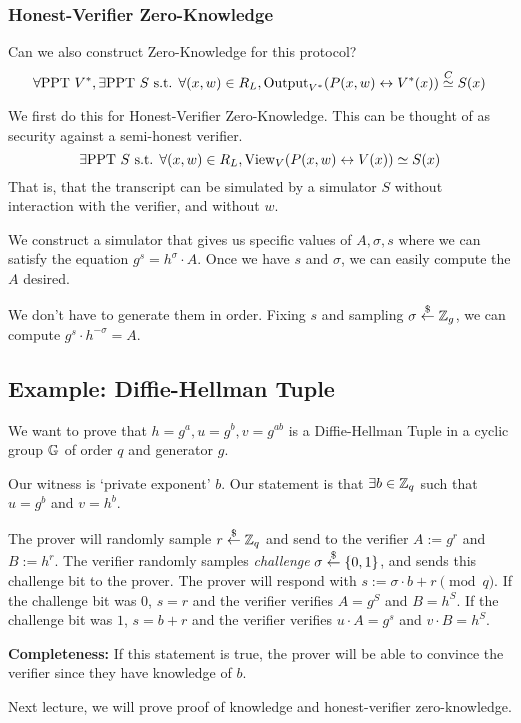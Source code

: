 \subsubsection{Honest-Verifier Zero-Knowledge}
Can we also construct Zero-Knowledge for this protocol?
\[\forall\mathrm{PPT}\ V^*, \exists\mathrm{PPT}\ S \text{ s.t. }\forall (x, w)\in R_L, \mathrm{Output}_{V^*}(P(x, w)\leftrightarrow V^*(x))\overset{C}{\simeq} S(x)\]

We first do this for Honest-Verifier Zero-Knowledge. This can be thought of as security against a semi-honest verifier.
\[\exists\mathrm{PPT}\ S\text{ s.t. }\forall(x, w)\in R_L, \mathrm{View}_V(P(x, w)\leftrightarrow V(x))\simeq S(x)\]
That is, that the transcript can be simulated by a simulator $S$ without interaction with the verifier, and without $w$.


We construct a simulator that gives us specific values of $A, \sigma, s$ where we can satisfy the equation $g^s = h^\sigma\cdot A$. Once we have $s$ and $\sigma$, we can easily compute the $A$ desired.

We don't have to generate them in order. Fixing $s$ and sampling $\sigma\overset{\$}{\leftarrow} \mathbb Z_g$, we can compute $g^s\cdot h^{-\sigma} = A$.

\subsection{Example: Diffie-Hellman Tuple}

We want to prove that $h = g^a, u = g^b, v = g^{ab}$ is a Diffie-Hellman Tuple in a cyclic group $\mathbb G$ of order $q$ and generator $g$.

Our witness is `private exponent' $b$. Our statement is that $\exists b\in \mathbb Z_q$ such that $u = g^b$ and $v = h^b$.


The prover will randomly sample $r\overset{\$}{\leftarrow} \mathbb Z_q$ and send to the verifier $A:=g^r$ and $B:=h^r$. The verifier randomly samples \emph{challenge} $\sigma \overset{\$}{\leftarrow} \{0, 1\}$, and sends this challenge bit to the prover. The prover will respond with $s := \sigma\cdot b + r\pmod{q}$. If the challenge bit was $0$, $s = r$ and the verifier verifies $A = g^S$ and $B = h^S$. If the challenge bit was $1$, $s = b + r$ and the verifier verifies $u\cdot A = g^s$ and $v\cdot B = h^S$.

\textbf{Completeness:} If this statement is true, the prover will be able to convince the verifier since they have knowledge of $b$.

Next lecture, we will prove proof of knowledge and honest-verifier zero-knowledge.